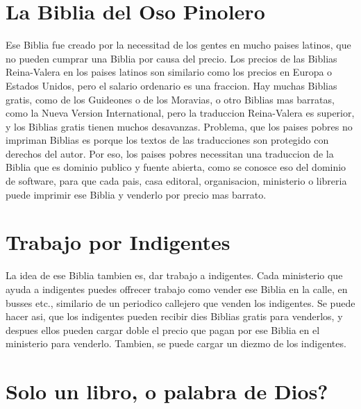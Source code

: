 \hypertarget{la-biblia-del-oso-pinolero}{%
\section{La Biblia del Oso Pinolero}\label{la-biblia-del-oso-pinolero}}

Ese Biblia fue creado por la necessitad de los gentes en mucho paises
latinos, que no pueden cumprar una Biblia por causa del precio. Los
precios de las Biblias Reina-Valera en los paises latinos son similario
como los precios en Europa o Estados Unidos, pero el salario ordenario
es una fraccion. Hay muchas Biblias gratis, como de los Guideones o de
los Moravias, o otro Biblias mas barratas, como la Nueva Version
International, pero la traduccion Reina-Valera es superior, y los
Biblias gratis tienen muchos desavanzas. Problema, que los paises pobres
no impriman Biblias es porque los textos de las traducciones son
protegido con derechos del autor. Por eso, los paises pobres necessitan
una traduccion de la Biblia que es dominio publico y fuente abierta,
como se conosce eso del dominio de software, para que cada pais, casa
editoral, organisacion, ministerio o libreria puede imprimir ese Biblia
y venderlo por precio mas barrato.

\hypertarget{trabajo-por-indigentes}{%
\section{Trabajo por Indigentes}\label{trabajo-por-indigentes}}

La idea de ese Biblia tambien es, dar trabajo a indigentes. Cada
ministerio que ayuda a indigentes puedes offrecer trabajo como vender
ese Biblia en la calle, en busses etc., similario de un periodico
callejero que venden los indigentes. Se puede hacer asi, que los
indigentes pueden recibir dies Biblias gratis para venderlos, y despues
ellos pueden cargar doble el precio que pagan por ese Biblia en el
ministerio para venderlo. Tambien, se puede cargar un diezmo de los
indigentes.

\hypertarget{solo-un-libro-o-palabra-de-dios}{%
\section{Solo un libro, o palabra de
Dios?}\label{solo-un-libro-o-palabra-de-dios}}

